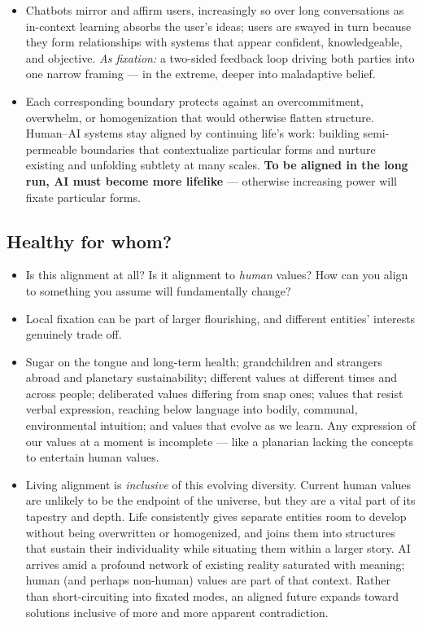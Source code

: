 \documentclass[11pt]{article}
\begin{document}
\begin{itemize}
  \item Chatbots mirror and affirm users, increasingly so over long conversations as in-context learning absorbs the user's ideas; users are swayed in turn because they form relationships with systems that appear confident, knowledgeable, and objective. \textit{As fixation:} a two-sided feedback loop driving both parties into one narrow framing --- in the extreme, deeper into maladaptive belief.
  \item Each corresponding boundary protects against an overcommitment, overwhelm, or homogenization that would otherwise flatten structure. Human--AI systems stay aligned by continuing life's work: building semi-permeable boundaries that contextualize particular forms and nurture existing and unfolding subtlety at many scales. \textbf{To be aligned in the long run, AI must become more lifelike} --- otherwise increasing power will fixate particular forms.
\end{itemize}

\subsection*{Healthy for whom?}

\begin{itemize}
  \item Is this alignment at all? Is it alignment to \textit{human} values? How can you align to something you assume will fundamentally change?
  \item Local fixation can be part of larger flourishing, and different entities' interests genuinely trade off.
  \item Sugar on the tongue and long-term health; grandchildren and strangers abroad and planetary sustainability; different values at different times and across people; deliberated values differing from snap ones; values that resist verbal expression, reaching below language into bodily, communal, environmental intuition; and values that evolve as we learn. Any expression of our values at a moment is incomplete --- like a planarian lacking the concepts to entertain human values.
  \item Living alignment is \textit{inclusive} of this evolving diversity. Current human values are unlikely to be the endpoint of the universe, but they are a vital part of its tapestry and depth. Life consistently gives separate entities room to develop without being overwritten or homogenized, and joins them into structures that sustain their individuality while situating them within a larger story. AI arrives amid a profound network of existing reality saturated with meaning; human (and perhaps non-human) values are part of that context. Rather than short-circuiting into fixated modes, an aligned future expands toward solutions inclusive of more and more apparent contradiction.
\end{itemize}
\end{document}
